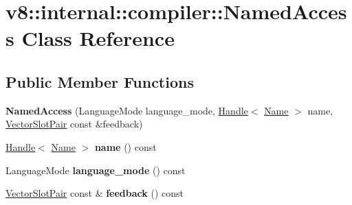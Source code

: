 \hypertarget{classv8_1_1internal_1_1compiler_1_1_named_access}{}\section{v8\+:\+:internal\+:\+:compiler\+:\+:Named\+Access Class Reference}
\label{classv8_1_1internal_1_1compiler_1_1_named_access}
\subsection*{Public Member Functions}
\begin{DoxyCompactItemize}
\item 
{\bfseries Named\+Access} (Language\+Mode language\+\_\+mode, \hyperlink{classv8_1_1internal_1_1_handle}{Handle}$<$ \hyperlink{classv8_1_1internal_1_1_name}{Name} $>$ name, \hyperlink{classv8_1_1internal_1_1compiler_1_1_vector_slot_pair}{Vector\+Slot\+Pair} const \&feedback)\hypertarget{classv8_1_1internal_1_1compiler_1_1_named_access_acfd25bf8ed99186b032bdfd35b57a6ee}{}\label{classv8_1_1internal_1_1compiler_1_1_named_access_acfd25bf8ed99186b032bdfd35b57a6ee}

\item 
\hyperlink{classv8_1_1internal_1_1_handle}{Handle}$<$ \hyperlink{classv8_1_1internal_1_1_name}{Name} $>$ {\bfseries name} () const \hypertarget{classv8_1_1internal_1_1compiler_1_1_named_access_a648ce66400639c183e65f43808377b71}{}\label{classv8_1_1internal_1_1compiler_1_1_named_access_a648ce66400639c183e65f43808377b71}

\item 
Language\+Mode {\bfseries language\+\_\+mode} () const \hypertarget{classv8_1_1internal_1_1compiler_1_1_named_access_ae953183ec50e34b0652868d355654f18}{}\label{classv8_1_1internal_1_1compiler_1_1_named_access_ae953183ec50e34b0652868d355654f18}

\item 
\hyperlink{classv8_1_1internal_1_1compiler_1_1_vector_slot_pair}{Vector\+Slot\+Pair} const \& {\bfseries feedback} () const \hypertarget{classv8_1_1internal_1_1compiler_1_1_named_access_ab832145d66a65683e3e6e80d51aa9e3e}{}\label{classv8_1_1internal_1_1compiler_1_1_named_access_ab832145d66a65683e3e6e80d51aa9e3e}

\end{DoxyCompactItemize}
